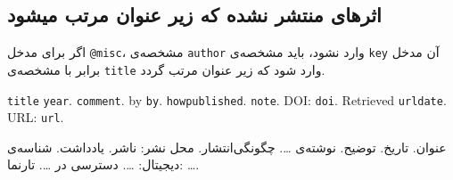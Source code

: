 \documentclass[a4paper,11pt]{article}
\begin{document}
\subsection{اثرهای منتشر نشده که زیر عنوان مرتب میشود}
اگر برای مدخل \verb|@misc|، مشخصه‌ی \verb|author| وارد نشود، باید مشخصه‌ی \verb|key| آن مدخل برابر با مشخصه‌ی \verb|title| وارد شود که زیر عنوان مرتب گردد.

\begin{itemize}[nosep]
\begin{latin}
\item[] []
{\tt title} {\tt year}. {\tt comment}. by {\tt by}. {\tt howpublished}. {\tt note}. DOI: {\tt doi}. Retrieved {\tt urldate}. URL: {\tt url}. 
\end{latin}

\item[] []
{\persianttfamily عنوان}. {\persianttfamily تاریخ}. {\persianttfamily توضیح}. نوشته‌ی {\persianttfamily …}. {\persianttfamily چگونگی‌انتشار}. {\persianttfamily محل نشر: ناشر}. {\persianttfamily یادداشت}. شناسه‌ی دیجیتال: {\persianttfamily …}. دسترسی در {\persianttfamily …}. تارنما: {\persianttfamily …}. 
\end{itemize}
\end{document}
